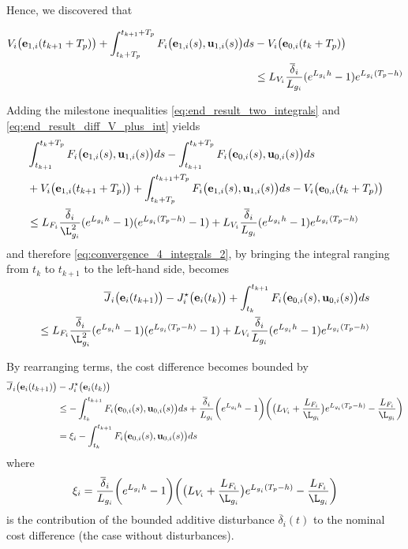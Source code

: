 Hence, we discovered that
\begin{bw_box}
\begin{align}
  V_i\big(\bm{\mathbf{e}}_{1,i}(t_{k+1} + T_p)\big)
  + \int_{t_k + T_p}^{t_{k+1} + T_p} F_i\big(\bm{\mathbf{e}}_{1,i}(s), \bm{\mathbf{u}}_{1,i}(s)\big) ds
  &- V_i\big(\bm{\mathbf{e}}_{0,i}(t_k + T_p)\big) \\
  &\leq L_{V_i}\dfrac{\overline{\delta}_i}{L_{g_i}} (e^{L_{g_i}h} - 1) e^{L_{g_i} (T_p - h)}
  \label{eq:end_result_diff_V_plus_int}
\end{align}
\end{bw_box}

Adding the milestone inequalities \eqref{eq:end_result_two_integrals} and
\eqref{eq:end_result_diff_V_plus_int} yields
\begin{alignat}{2}
  &\int_{t_{k+1}}^{t_k + T_p} F_i \big(\vect{e}_{1,i}(s), \vect{u}_{1,i} (s)\big) d s
  - \int_{t_{k+1}}^{t_k + T_p} F_i \big(\vect{e}_{0,i}(s), \vect{u}_{0,i} (s)\big) d s \\
  &+ V_i\big(\vect{e}_{1,i}(t_{k+1} + T_p)\big)
  + \int_{t_k + T_p}^{t_{k+1} + T_p} F_i\big(\vect{e}_{1,i}(s), \vect{u}_{1,i}(s)\big) ds
  - V_i\big(\vect{e}_{0,i}(t_k + T_p)\big) \\
  &\leq L_{F_i} \dfrac{\overline{\delta}_i}{\L_{g_i}^2} (e^{L_{g_i} h} - 1) (e^{L_{g_i}(T_p-h)} - 1)
  + L_{V_i}\dfrac{\overline{\delta}_i}{L_{g_i}} (e^{L_{g_i}h} - 1) e^{L_{g_i} (T_p - h)}
\end{alignat}
and therefore \eqref{eq:convergence_4_integrals_2}, by bringing the integral
ranging from $t_k$ to $t_{k+1}$ to the left-hand side, becomes
\begin{align}
  \overline{J}_i\big(\vect{e}_i(t_{k+1})\big)
    - J_i^{\star}\big(\vect{e}_i(t_k)\big)
    + \int_{t_k}^{t_{k+1}} F_i \big(\vect{e}_{0,i}(s), \vect{u}_{0,i} (s)\big) d s \\
    \leq L_{F_i} \dfrac{\overline{\delta}_i}{\L_{g_i}^2} (e^{L_{g_i} h} - 1) (e^{L_{g_i}(T_p-h)} - 1)
  + L_{V_i}\dfrac{\overline{\delta}_i}{L_{g_i}} (e^{L_{g_i}h} - 1) e^{L_{g_i} (T_p - h)}
\end{align}

By rearranging terms, the cost difference becomes bounded by
\begin{align}
  \overline{J}_i\big(\vect{e}_i(t_{k+1})\big) &- J_i^{\star}\big(\vect{e}_i(t_k)\big) \\
  &\leq -\int_{t_k}^{t_{k+1}} F_i \big(\vect{e}_{0,i}(s), \vect{u}_{0,i} (s)\big) d s
    + \dfrac{\overline{\delta}_i}{L_{g_i}} \bigg(e^{L_{g_i}h} - 1\bigg)
    \bigg(\big(L_{V_i} + \dfrac{L_{F_i}}{\L_{g_i}}\big) e^{L_{g_i}(T_p-h)}  - \dfrac{L_{F_i}}{\L_{g_i}}\bigg) \\
  &= \xi_i -\int_{t_k}^{t_{k+1}} F_i \big(\vect{e}_{0,i}(s), \vect{u}_{0,i} (s)\big) d s
\end{align}
where
\begin{align}
  \xi_i = \dfrac{\overline{\delta}_i}{L_{g_i}} \bigg(e^{L_{g_i}h} - 1\bigg)
    \bigg(\big(L_{V_i} + \dfrac{L_{F_i}}{\L_{g_i}}\big) e^{L_{g_i}(T_p-h)}  - \dfrac{L_{F_i}}{\L_{g_i}}\bigg)
\end{align}
is the contribution of the bounded additive disturbance $\overline{\delta}_i(t)$
to the nominal cost difference (the case without disturbances).

